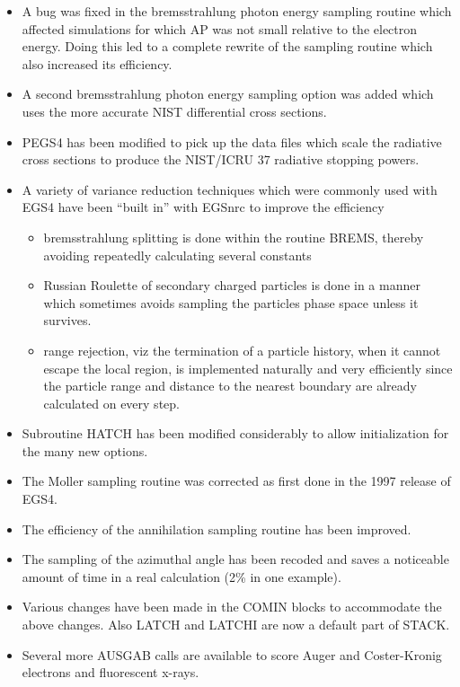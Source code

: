 \begin{itemize}
\item A bug was fixed in the bremsstrahlung photon energy sampling routine
which affected simulations for which AP was not small relative to the electron
energy.  Doing this led to a complete rewrite of the sampling routine which
also increased its efficiency.

\item A second bremsstrahlung photon energy sampling option was added which 
uses the more accurate NIST differential cross sections.

\item PEGS4 has been modified to pick up the data files which scale the
radiative cross sections to produce the NIST/ICRU 37 radiative stopping
powers.

\item A variety of variance reduction techniques which were commonly used
with EGS4 have been ``built in'' with EGSnrc to improve the efficiency
   \begin{itemize} 
   \item bremsstrahlung splitting is done within the routine BREMS, thereby
         avoiding repeatedly calculating several constants
   \item Russian Roulette of secondary charged particles is done in a
         manner which sometimes avoids sampling the particles phase space unless
         it survives.
   \item range rejection, viz the termination of a particle history, when
         it cannot escape the local region, is implemented naturally and
         very efficiently since the particle range and distance to the
	 nearest boundary are already calculated on every step.
   \end{itemize}

\item Subroutine HATCH has been modified considerably to allow
initialization for the many new options.

\item The Moller sampling routine was corrected as first done in the
1997 release of EGS4.


\item The efficiency of the annihilation sampling routine has been
improved.

\item The sampling of the azimuthal angle has been recoded and saves a
noticeable amount of time in a real calculation (2\% in one example).

\item Various changes have been made in the COMIN blocks to accommodate the
above changes. Also LATCH and LATCHI are  now a default part of STACK. 

\item Several more AUSGAB calls are available to score Auger
and Coster-Kronig electrons and fluorescent x-rays.

\end{itemize} 



